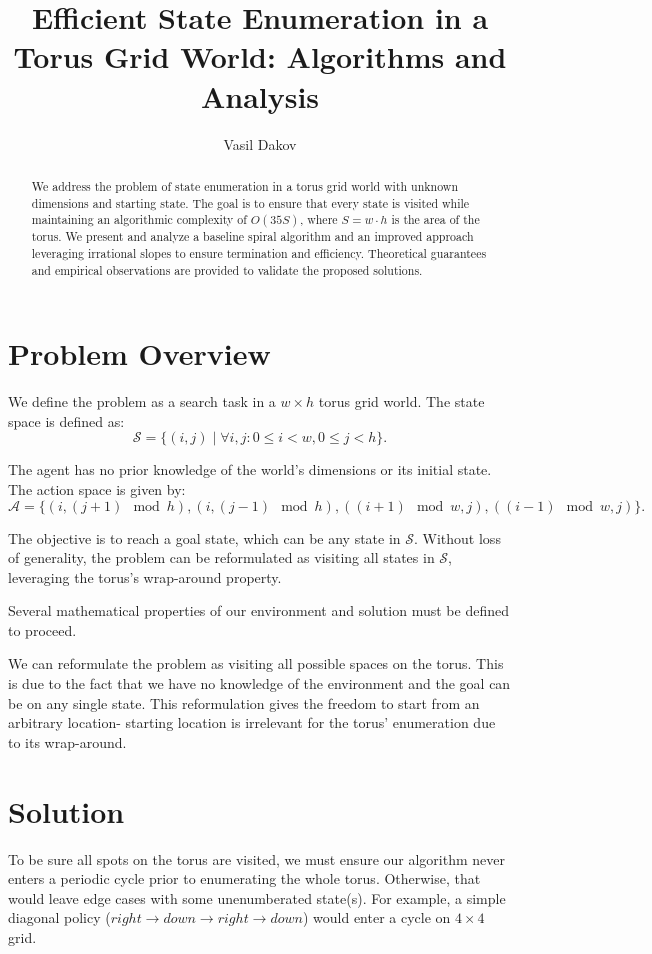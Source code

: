 \documentclass{article}
\begin{document}
\title{Efficient State Enumeration in a Torus Grid World: Algorithms and Analysis}
\author{Vasil Dakov}
\date{}
\maketitle

\begin{abstract}
    We address the problem of state enumeration in a torus grid world with unknown dimensions and starting state. The goal is to ensure that every state is visited while maintaining an algorithmic complexity of $O(35S)$, where $S = w \cdot h$ is the area of the torus. We present and analyze a baseline spiral algorithm and an improved approach leveraging irrational slopes to ensure termination and efficiency. Theoretical guarantees and empirical observations are provided to validate the proposed solutions.
\end{abstract}

\section{Problem Overview}
We define the problem as a search task in a $w \times h$ torus grid world. The
state space is defined as:
\[
    \mathcal{S} = \{(i, j) \mid \forall i, j: 0 \leq i < w, 0 \leq j < h\}.
\]

The agent has no prior knowledge of the world's dimensions or its initial
state. The action space is given by:
\[
    \mathcal{A} = \{(i, (j + 1) \mod h), (i, (j - 1) \mod h), ((i + 1) \mod w, j), ((i - 1) \mod w, j)\}.
\]

The objective is to reach a goal state, which can be any state in
$\mathcal{S}$. Without loss of generality, the problem can be reformulated as
visiting all states in $\mathcal{S}$, leveraging the torus's wrap-around
property.

Several mathematical properties of our environment and solution must be defined
to proceed.

We can reformulate the problem as visiting all possible spaces on the torus.
This is due to the fact that we have no knowledge of the environment and the
goal can be on any single state. This reformulation gives the freedom to start
from an arbitrary location- starting location is irrelevant for the torus'
enumeration due to its wrap-around.

\section{Solution}
To be sure all spots on the torus are visited, we must ensure our algorithm
never enters a periodic cycle prior to enumerating the whole torus. Otherwise,
that would leave edge cases with some unenumberated state(s). For example, a
simple diagonal policy ($right \to down \to right \to down$) would enter a
cycle on $4 \times 4$ grid.
\end{document}
